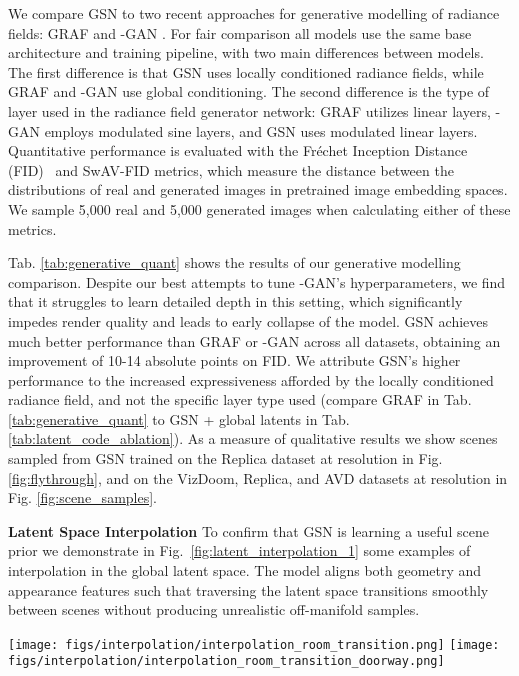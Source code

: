 \documentclass[10pt,twocolumn,letterpaper]{article}
\begin{document}
We compare GSN to two recent approaches for generative modelling of radiance fields: GRAF \cite{graf} and -GAN \cite{pigan}. For fair comparison all models use the same base architecture and training pipeline, with two main differences between models. The first difference is that GSN uses locally conditioned radiance fields, while GRAF and -GAN use global conditioning. The second difference is the type of layer used in the radiance field generator network: GRAF utilizes linear layers, -GAN employs modulated sine layers, and GSN uses modulated linear layers. Quantitative performance is evaluated with the Fr\'{e}chet Inception Distance (FID)~\cite{fid} and SwAV-FID \cite{swavfid} metrics, which measure the distance between the distributions of real and generated images in pretrained image embedding spaces. We sample 5,000 real and 5,000 generated images when calculating either of these metrics.

Tab. \ref{tab:generative_quant} shows the results of our generative modelling comparison. Despite our best attempts to tune -GAN's hyperparameters, we find that it struggles to learn detailed depth in this setting, which significantly impedes render quality and leads to early collapse of the model. GSN achieves much better performance than GRAF or -GAN across all datasets, obtaining an improvement of 10-14 absolute points on FID. We attribute GSN's higher performance to the increased expressiveness afforded by the locally conditioned radiance field, and not the specific layer type used (compare GRAF in Tab. \ref{tab:generative_quant} to GSN + global latents in Tab. \ref{tab:latent_code_ablation}). As a measure of qualitative results we show scenes sampled from GSN trained on the Replica dataset at  resolution in Fig. \ref{fig:flythrough}, and on the VizDoom, Replica, and AVD datasets at  resolution in Fig. \ref{fig:scene_samples}.

\textbf{Latent Space Interpolation} To confirm that GSN is learning a useful scene prior we demonstrate in Fig.~\ref{fig:latent_interpolation_1} some examples of interpolation in the global latent space. The model aligns both geometry and appearance features such that traversing the latent space transitions smoothly between scenes without producing unrealistic off-manifold samples. 

\begin{figure*}[t]
    \centering
    \texttt{[image: figs/interpolation/interpolation\_room\_transition.png]}
    \texttt{[image: figs/interpolation/interpolation\_room\_transition\_doorway.png]}
    \caption{Two example latent interpolations between global latent codes . Scenes transition smoothly by aligning geometry features such as walls (top) and appearance features such as the picture frame and doorway (bottom). Views are rendered from a fixed camera pose.}
    \label{fig:latent_interpolation_1}
\end{figure*}
\end{document}
